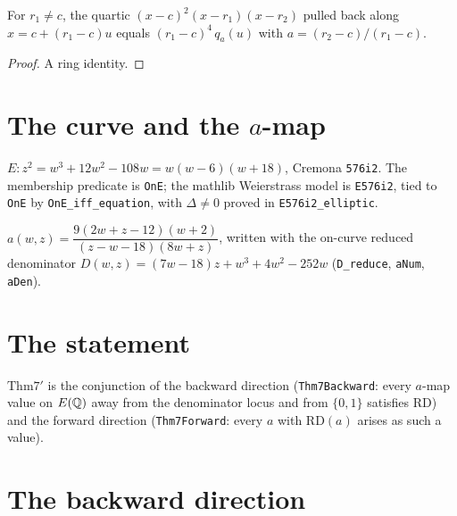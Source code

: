\begin{lemma}
\label{lem:normalize}
\leanok
{}
For $r_1 \neq c$, the quartic $(x-c)^2(x-r_1)(x-r_2)$ pulled back along
$x = c + (r_1-c)u$ equals $(r_1-c)^4\, q_a(u)$ with
$a = (r_2-c)/(r_1-c)$.
\end{lemma}
\begin{proof}\leanok
A ring identity.
\end{proof}

\section{The curve and the $a$-map}

\begin{definition}\label{def:E}
\leanok
$E\colon z^2 = w^3+12w^2-108w = w(w-6)(w+18)$, Cremona \texttt{576i2}.
The membership predicate is \texttt{OnE}; the mathlib Weierstrass model
is \texttt{E576i2}, tied to \texttt{OnE} by
\texttt{OnE\_iff\_equation}, with $\Delta \neq 0$ proved in
\texttt{E576i2\_elliptic}.
\end{definition}

\begin{definition}\label{def:amap}
\leanok
{}
$a(w,z) = \dfrac{9(2w+z-12)(w+2)}{(z-w-18)(8w+z)}$, written with the
on-curve reduced denominator
$D(w,z) = (7w-18)z + w^3+4w^2-252w$ (\texttt{D\_reduce},
\texttt{aNum}, \texttt{aDen}).
\end{definition}

\section{The statement}

\begin{definition}\label{def:thm7prime}
\leanok
{}
$\mathrm{Thm7'}$ is the conjunction of the backward direction
(\texttt{Thm7Backward}: every $a$-map value on $E(\mathbb{Q})$ away from the
denominator locus and from $\{0,1\}$ satisfies $\mathrm{RD}$) and the
forward direction (\texttt{Thm7Forward}: every $a$ with $\mathrm{RD}(a)$
arises as such a value).
\end{definition}

\section{The backward direction}

